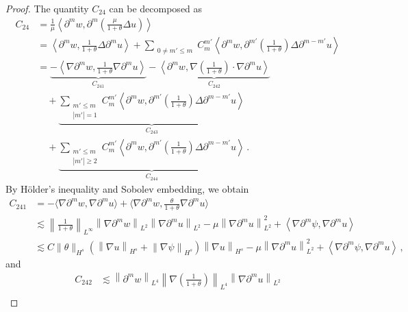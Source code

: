\documentclass[10pt,a4paper]{amsart}
\def\p{\partial}
\begin{document}
\begin{proof}
The quantity $C_{24}$ can be decomposed as
\begin{align*}
C_{24}&=\frac{1}{\mu} \left\langle \partial^m w, \partial^m \left( \frac{\mu}{1+\theta} \Delta u \right) \right\rangle \\&
= \left\langle \partial^m w, \frac{1}{1+\theta} \Delta \partial^m u \right\rangle + \sum_{\substack{0 \neq m' \leq m}} C_m^{m'} \left\langle \partial^m w, \partial^{m'} \left( \frac{1}{1+\theta} \right) \Delta \partial^{m-m'} u \right\rangle \\&
= \underset{C_{241}}{\underbrace{-\left\langle \nabla \partial^m w, \frac{1}{1+\theta} \nabla \partial^m u \right\rangle }} - \underset{C_{242}}{\underbrace{\left\langle \partial^m w, \nabla \left( \frac{1}{1+\theta} \right) \cdot \nabla \partial^m u \right\rangle }} \\&
\quad+ \underset{C_{243}}{\underbrace{\sum_{\substack{m' \leq m \\ |m'|=1}} C_m^{m'} \left\langle \partial^m w, \partial^{m'} \left( \frac{1}{1+\theta} \right) \Delta \partial^{m-m'} u \right\rangle}} \\
& \quad+ \underset{C_{244}}{\underbrace{\sum_{\substack{m' \leq m \\ |m'| \geq 2}} C_m^{m'} \left\langle \partial^m w, \partial^{m'} \left( \frac{1}{1+\theta} \right) \Delta \partial^{m-m'} u \right\rangle}} \,.
\end{align*}
By H\"older's inequality and Sobolev embedding, we obtain
\begin{equation*}
\begin{aligned}
C_{241}&=-\langle\nabla\p^m w,\nabla \p^m u\rangle+\langle\nabla\p^m w,\frac{\theta}{1+\theta}\nabla \p^m u\rangle
\\&\lesssim \left\| \frac{1}{1+\theta} \right\|_{L^\infty} \left\| \nabla \partial^m w \right\|_{L^2} \left\| \nabla \partial^m u \right\|_{L^2} - \mu \left\| \nabla \partial^m u \right\|_{L^2}^2 + \left\langle \nabla\partial^m \psi, \nabla \partial^m u \right\rangle \\&
\lesssim C\|\theta\|_{H^s}\left( \left\| \nabla u \right\|_{H^s} + \left\| \nabla \psi \right\|_{H^s} \right) \left\| \nabla u \right\|_{H^s} - \mu \left\| \nabla \partial^m u \right\|_{L^2}^2 + \left\langle \nabla\partial^m \psi, \nabla \partial^m u \right\rangle \,,
\end{aligned}
\end{equation*}
and
\begin{equation*}
\begin{aligned}
C_{242}&\lesssim \left\| \partial^m w \right\|_{L^4} \left\| \nabla \left( \frac{1}{1+\theta} \right) \right\|_{L^4} \left\| \nabla \partial^m u \right\|_{L^2} \\&

\end{aligned}
\end{equation*}
\end{proof}
\end{document}
